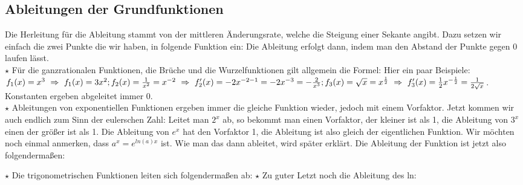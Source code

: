 \subsection{Ableitungen der Grundfunktionen}
	Die Herleitung für die Ableitung stammt von der mittleren Änderungsrate, welche
	die Steigung einer Sekante angibt. Dazu setzen wir einfach die zwei Punkte die
	wir haben, in folgende Funktion ein:
	Die Ableitung erfolgt dann, indem man den Abstand der Punkte
	gegen 0 laufen lässt.\\

	\(\star\) Für die ganzrationalen Funktionen, die Brüche und die
	Wurzelfunktionen gilt allgemein die Formel:
	\formel{\[f(x)=x^n\ \Rightarrow\ f'(x)=n\cdot x^{n-1}\]}
	Hier ein paar Beispiele: \(f_1(x)=x^3\ \Rightarrow\ f_1(x)=3x^2;\\
	f_2(x)=\frac{1}{x^2}=x^{-2}\ \Rightarrow\
	f_2'(x)=-2x^{-2-1}=-2x^{-3}=-\frac{2}{x^3};\\
	f_3(x)=\sqrt{x}=x^{\frac{1}{2}}\
	\Rightarrow\ f_3'(x)=\frac{1}{2}x^{-\frac{1}{2}}=\frac{1}{2\sqrt{x}}\).\\
	Konstanten ergeben abgeleitet immer 0.\\

	\(\star\) Ableitungen von exponentiellen Funktionen ergeben immer die gleiche
	Funktion wieder, jedoch mit einem Vorfaktor. Jetzt kommen wir auch endlich zum
	Sinn der eulerschen Zahl: Leitet man \(2^x\) ab, so bekommt man einen
	Vorfaktor, der kleiner ist als 1, die Ableitung von \(3^x\) einen der größer
	ist als 1. Die Ableitung von \(e^x\) hat den Vorfaktor 1, die Ableitung ist
	also gleich der eigentlichen Funktion. Wir möchten noch einmal anmerken, dass
	\(a^x=e^{ln(a)x}\) ist. Wie man das dann ableitet, wird später erklärt. Die
	Ableitung der Funktion ist jetzt also folgendermaßen:
	\formel{\[f(x)=e^x\ \Rightarrow\ f'(x)=e^x\]}

	\(\star\) Die trigonometrischen Funktionen leiten sich folgendermaßen ab:
	\formel{\[f_1(x)=sin(x)\ \Rightarrow\ f_1'(x)=cos(x)\ \&\ f_2(x)=cos(x)\
	\Rightarrow\ f_2'(x)=-sin(x)\]}
	\(\star\) Zu guter Letzt noch die Ableitung des ln:
	\formel{\[f(x)=ln(x)\ \Rightarrow\ f'(x)=\frac{1}{x}\]}

